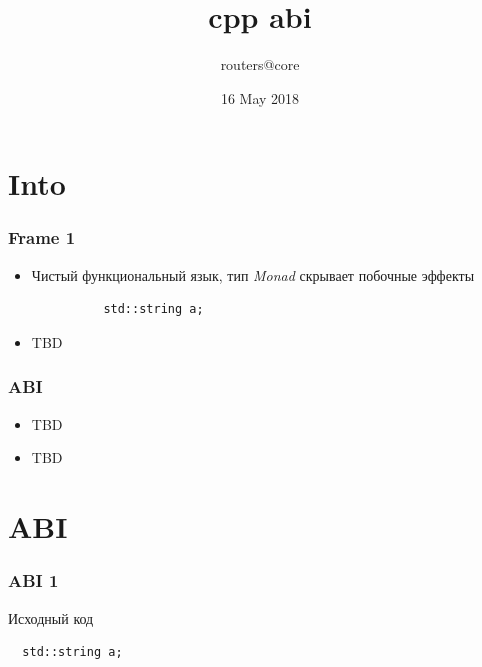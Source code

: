 \documentclass{beamer}
\title[CPP ABI]
    {cpp abi}
\author{routers@core}
\date{16 May 2018}
\begin{document}
\maketitle

\section{Into}

\begin{frame}[fragile]
\frametitle{Frame 1}
\begin{itemize}
\item<+-> Чистый функциональный язык, тип \emph{Monad} скрывает побочные эффекты
        \begin{verbatim}
          std::string a;
        \end{verbatim}
\item<+-> TBD
\end{itemize}
\end{frame}

\begin{frame}[fragile]
\frametitle{ABI}
\begin{itemize}
\item<+-> TBD
\item<+-> TBD
\end{itemize}
\end{frame}

\section{ABI}

\begin{frame}[fragile]
\frametitle{ABI 1}
Исходный код 
\begin{verbatim}
  std::string a;
\end{verbatim}
\end{frame}
\end{document}

